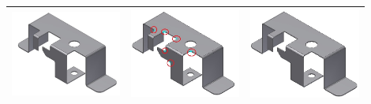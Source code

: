 \begin{minipage}[t]{\linewidth}
\begin{tabular}[h]{@{} p{0.3\linewidth} p{0.3\linewidth}  p{0.3\linewidth}@{}}
\includegraphics[width=0.98\linewidth]{..//Common/images/DefeatPhase_I_1} &
\includegraphics[width=0.98\linewidth]{..//Common/images/DefeatPhase_I_2} &
\includegraphics[width=0.98\linewidth]{..//Common/images/DefeatPhase_I_3} \\ \bottomrule


\end{tabular}
\end{minipage}
